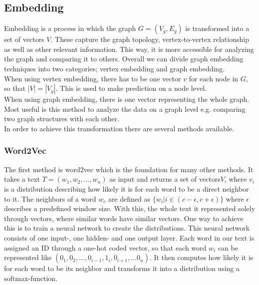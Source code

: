 \documentclass[sigconf]{acmart}
\begin{document}
\subsection{Embedding}
Embedding is a process in which the graph \(G = (V_g, E_g)\) is transformed into a set of vectors \(V\).
These capture the graph topology, vertex-to-vertex relationship as well as other relevant information.
This way, it is more accessible for analyzing the graph and comparing it to others.
Overall we can divide graph embedding techniques into two categories; 
vertex embedding and graph embedding. \\
When using vertex embedding, there has to be one vector \(v\) for each node in \(G\), so that \(|V| = |V_g|\). This is used to make prediction 
on a node level.\\
When using graph embedding, there is one vector representing the whole graph. Most useful is this method to analyze the data on a graph level e.g.
comparing two graph structures with each other.\\
In order to achieve this transformation there are several methods available.

\subsubsection{Word2Vec}
The first method is word2vec which is the foundation for many other methods. 
It takes a text \(T = (w_1, w_2, \ldots, w_n)\) as input and returns a set of vectors\(V\), where \(v_i\) is a distribution describing how likely it is for each word 
to be a direct neighbor to it. The neighbors of a word \(w_c\) are defined as \(\{w_i | i \in (c-\epsilon, c+\epsilon)\}\) where \(\epsilon\) describes a predefined window size.
With this, the whole text it represented solely through vectors, where similar words have similar vectors.
One way to achieve this is to train a neural network to create the distributions. This neural network consists of one input-, one hidden- and one output layer. 
Each word in our text is assigned an ID through a one-hot coded vector, so that each word \(w_i\) can be represented like \((0_1, 0_2, \ldots, 0_{i-1}, 1_i, 0_{i+1}, \ldots 0_n)\).
It then computes how likely it is for each word to be its neighbor and transforms it into a distribution using a softmax-function\cite{softmax}.
\end{document}
